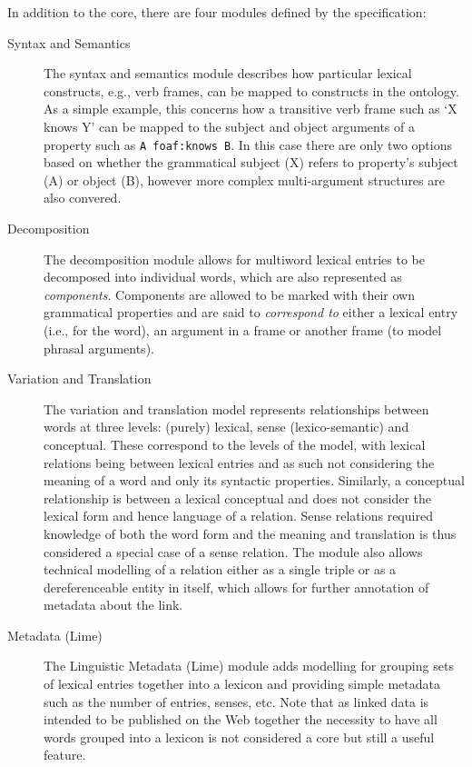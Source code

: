 \documentclass[12pt,a4paper]{elex2017}
\begin{document}
In addition to the core, there are four modules defined by the specification:

\begin{description}
    \item[Syntax and Semantics] The syntax and semantics module describes how
        particular lexical constructs, e.g., verb frames, can be mapped to
        constructs in the ontology. As a simple example, this concerns how a
        transitive verb frame such as `X knows Y' can be mapped to the subject
        and object arguments of a property such as \texttt{A foaf:knows B}. In this
        case there are only two options based on whether the grammatical subject
        (X) refers to property's subject (A) or object (B), however more complex
        multi-argument structures are also convered.
    \item[Decomposition] The decomposition module allows for multiword lexical
        entries to be decomposed into individual words, which are also
        represented as \emph{components}. Components are allowed to be marked
        with their own grammatical properties and are said to \emph{correspond
        to} either a lexical entry (i.e., for the word), an argument in a frame
        or another frame (to model phrasal arguments). 
    \item[Variation and Translation] The variation and translation model
        represents relationships between words at three levels: (purely)
        lexical, sense (lexico-semantic) and conceptual. These correspond
        to the levels of the model, with lexical relations being between lexical
        entries and as such not considering the meaning of a word and only its
        syntactic properties. Similarly, a conceptual relationship is between a
        lexical conceptual and does not consider the lexical form and hence
        language of a relation. Sense relations required knowledge of
        both the word form and the meaning and translation is thus considered a
        special case of a sense relation. The module also allows technical
        modelling of a relation either as a single triple or as a
        dereferenceable entity in itself, which allows for further annotation of
        metadata about the link.
    \item[Metadata (Lime)] The Linguistic Metadata (Lime) module adds modelling
        for grouping sets of lexical entries together into a lexicon and
        providing simple metadata such as the number of entries, senses, etc.
        Note that as linked data is intended to be published on the Web together
        the necessity to have all words grouped into a lexicon is not considered
        a core but still a useful feature.
\end{description}
\end{document}
